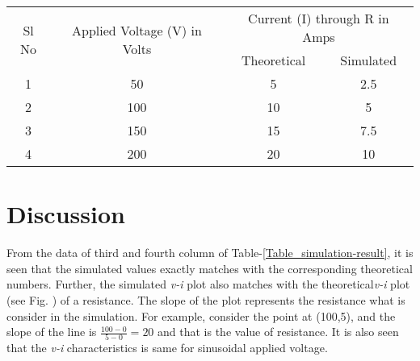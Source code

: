 \begin{minipage}{\textwidth}
    \begin{minipage}[b]{0.6\textwidth}
        \centering
        \begin{tabular}{|c|c|c|c|}
            \hline
            \multirow{2}{*}{Sl No} & \multirow{2}{*}{Applied Voltage (V) in Volts} & \multicolumn{2}{c|}{Current (I) through R in Amps}             \\
            \cline{3-4}
                                   &                                               & Theoretical                                        & Simulated \\
            \hline
            1                      & 50                                            & 5                                                  & 2.5       \\
            \hline
            2                      & 100                                           & 10                                                 & 5         \\
            \hline
            3                      & 150                                           & 15                                                 & 7.5       \\
            \hline
            4                      & 200                                           & 20                                                 & 10        \\
            \hline
        \end{tabular}
        \label{Table_simulation-result}
    \end{minipage}
    \hfill

\end{minipage}

\section{Discussion}
\hspace{1.5cm} From the data of third and fourth column of Table-\ref{Table_simulation-result}, it is seen that the simulated values exactly matches with the corresponding theoretical numbers. Further, the simulated \textit{v-i} plot also matches with the theoretical\textit{v-i} plot (see Fig. ) of a resistance. The slope of the plot represents the resistance what is consider in the simulation. For example, consider the point at (100,5), and the slope of the line is $\frac{100-0}{5-0}=20$ and that is the value of resistance. It is also seen that the \textit{v-i} characteristics is same for sinusoidal applied voltage.

